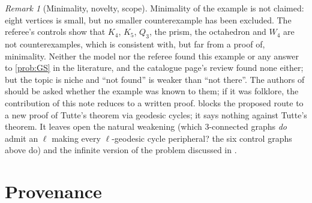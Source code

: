 \documentclass[11pt,a4paper]{article}
\theoremstyle{plain}
\theoremstyle{definition}
\theoremstyle{remark}
\newtheorem{remark}[theorem]{Remark}
\begin{document}
\begin{remark}[Minimality, novelty, scope]\label{rem:scope}
Minimality of the example is not claimed: eight vertices is small, but no smaller counterexample has been excluded. The referee's controls show that $K_4$, $K_5$, $Q_3$, the prism, the octahedron and $W_4$ are not counterexamples, which is consistent with, but far from a proof of, minimality. Neither the model nor the referee found this example or any answer to \cref{prob:GS} in the literature, and the catalogue page's review found none either; but the topic is niche and ``not found'' is weaker than ``not there''. The authors of \cite{GS09} should be asked whether the example was known to them; if it was folklore, the contribution of this note reduces to a written proof.  blocks the proposed route to a new proof of Tutte's theorem via geodesic cycles; it says nothing against Tutte's theorem. It leaves open the natural weakening (which $3$-connected graphs \emph{do} admit an $\ell$ making every $\ell$-geodesic cycle peripheral? the six control graphs above do) and the infinite version of the problem discussed in \cite{GS09}.
\end{remark}

\section{Provenance}\label{sec:provenance}
\end{document}
